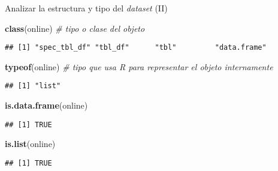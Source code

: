 \documentclass[
  ignorenonframetext,
]{beamer}
\newenvironment{Shaded}{\begin{snugshade}}{\end{snugshade}}
\newcommand{\CommentTok}[1]{\textcolor[rgb]{0.56,0.35,0.01}{\textit{#1}}}
\newcommand{\KeywordTok}[1]{\textcolor[rgb]{0.13,0.29,0.53}{\textbf{#1}}}
\newcommand{\NormalTok}[1]{#1}
\begin{document}
\begin{frame}[fragile]{Analizar la estructura y tipo del \emph{dataset}
(II)}
\protect\hypertarget{analizar-la-estructura-y-tipo-del-dataset-ii}{}

\begin{Shaded}
\begin{Highlighting}[]
\KeywordTok{class}\NormalTok{(online) }\CommentTok{# tipo o clase del objeto}
\end{Highlighting}
\end{Shaded}

\begin{verbatim}
## [1] "spec_tbl_df" "tbl_df"      "tbl"         "data.frame"
\end{verbatim}

\begin{Shaded}
\begin{Highlighting}[]
\KeywordTok{typeof}\NormalTok{(online) }\CommentTok{# tipo que usa R para representar el objeto internamente}
\end{Highlighting}
\end{Shaded}

\begin{verbatim}
## [1] "list"
\end{verbatim}

\begin{Shaded}
\begin{Highlighting}[]
\KeywordTok{is.data.frame}\NormalTok{(online)}
\end{Highlighting}
\end{Shaded}

\begin{verbatim}
## [1] TRUE
\end{verbatim}

\begin{Shaded}
\begin{Highlighting}[]
\KeywordTok{is.list}\NormalTok{(online)}
\end{Highlighting}
\end{Shaded}

\begin{verbatim}
## [1] TRUE
\end{verbatim}

\end{frame}
\end{document}
